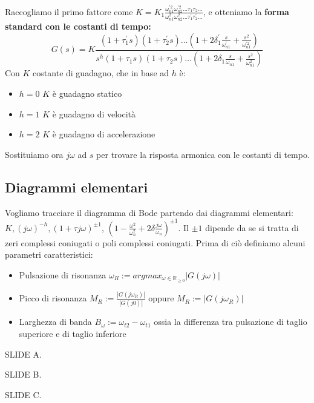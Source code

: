 \documentclass[11pt]{article}
\begin{document}
Raccogliamo il primo fattore come $K=K_1\frac{\omega^{'2}_{n1}\omega^{'2}_{n2}...\tau_1\tau_2...}{\omega^{2}_{n1}\omega^{2}_{n2}...\tau_1^{'}\tau_2^{'}...} $, e otteniamo la \textbf{forma standard con le costanti di tempo:}
\begin{displaymath}
    G(s)=K\frac{(1+\tau_1^{'}s)(1+\tau_2^{'}s)\dots\left(1+2\delta^{'}_1 \frac{s}{\omega^{'}_{n1}}+\frac{s^2}{\omega^{'2}_{n1}}\right)}{s^h(1+\tau_1s)(1+\tau_2s)\dots\left(1+2\delta_1 \frac{s}{\omega_{n1}}+\frac{s^2}{\omega^{2}_{n1}}\right)}
\end{displaymath}
Con $K$ costante di guadagno, che in base ad $h$ è:
\begin{itemize}
    \item $h=0$ $K$ è guadagno statico
    \item $h=1$ $K$ è guadagno di velocità
    \item $h=2$ $K$ è guadagno di accelerazione
\end{itemize}
Sostituiamo ora $j\omega$ ad $s$ per trovare la risposta armonica con le costanti di tempo. 
\subsection{Diagrammi elementari}
Vogliamo tracciare il diagramma di Bode partendo dai diagrammi elementari: $K, (j\omega)^{-h}, (1+\tau j \omega)^{\pm 1}$, $\left(1-\frac{\omega^2}{\omega^2_n}+2\delta \frac{j\omega}{\omega_n}\right)^{\pm1}$. Il $\pm1$ dipende da se si tratta di zeri complessi coniugati o poli complessi coniugati. 
Prima di ciò definiamo alcuni parametri caratteristici:
\begin{itemize}
    \item Pulsazione di risonanza $\omega_R := arg max_{\omega \in \mathbb{R}_{\ge0}}|G(j\omega)|$
    \item Picco di risonanza $M_R := \frac{|G(j\omega_R)|}{|G(j0)|}$ oppure $M_R := |G(j\omega_R)|$
    \item Larghezza di banda $B_\omega := \omega_{t2} - \omega_{t1}$ ossia la differenza tra pulsazione di taglio superiore e di taglio inferiore
\end{itemize}
SLIDE A.

SLIDE B.

SLIDE C.
\end{document}
